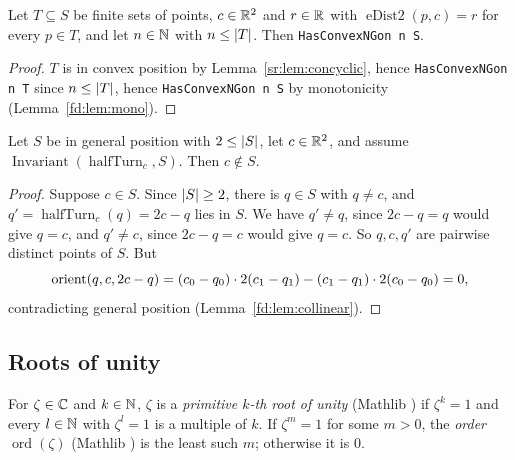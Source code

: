 \begin{corollary}\label{sr:cor:concyclic}
Let $T\subseteq S$ be finite sets of points, $c\in\mathbb R^2$ and $r\in\mathbb R$ with $\operatorname{eDist2}(p,c)=r$ for every $p\in
T$, and let $n\in\mathbb N$ with $n\le\lvert T\rvert$. Then \texttt{HasConvexNGon n S}.
\end{corollary}

\begin{proof}
$T$ is in convex position by Lemma~\ref{sr:lem:concyclic}, hence \texttt{HasConvexNGon n T} since $n\le\lvert T\rvert$, hence
\texttt{HasConvexNGon n S} by monotonicity (Lemma~\ref{fd:lem:mono}).
\end{proof}

\begin{lemma}\label{sr:lem:center}
Let $S$ be in general position with $2\le\lvert S\rvert$, let $c\in\mathbb R^2$, and assume
$\operatorname{Invariant}(\operatorname{halfTurn}_c,S)$. Then $c\notin S$.
\end{lemma}

\begin{proof}
Suppose $c\in S$. Since $\lvert S\rvert\ge2$, there is $q\in S$ with $q\ne c$, and $q'=\operatorname{halfTurn}_c(q)=2c-q$ lies
in $S$. We have $q'\ne q$, since $2c-q=q$ would give $q=c$, and $q'\ne c$, since $2c-q=c$ would give $q=c$. So $q,c,q'$
are pairwise distinct points of $S$. But
\[
\operatorname{orient}(q,c,2c-q)=(c_0-q_0)\cdot2(c_1-q_1)-(c_1-q_1)\cdot2(c_0-q_0)=0,
\]
contradicting general position (Lemma~\ref{fd:lem:collinear}).
\end{proof}

\subsection{Roots of unity}\label{sr:ssec:roots}

\begin{definition}\label{sr:def:prim}
For $\zeta\in\mathbb C$ and $k\in\mathbb N$, $\zeta$ is a \emph{primitive $k$-th root of unity} (Mathlib ) if
$\zeta^k=1$ and every $l\in\mathbb N$ with $\zeta^l=1$ is a multiple of $k$. If $\zeta^m=1$ for some $m>0$, the \emph{order}
$\operatorname{ord}(\zeta)$ (Mathlib ) is the least such $m$; otherwise it is $0$.
\end{definition}

